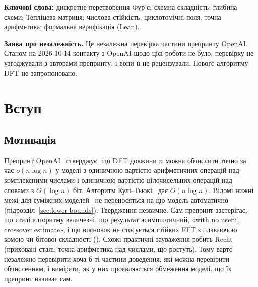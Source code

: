 \documentclass[11pt]{article}
\theoremstyle{plain}
\newcommand{\en}[1]{\foreignlanguage{english}{#1}}
\begin{document}
\noindent\textbf{Ключові слова:} дискретне перетворення Фур'є; схемна складність; глибина схеми; Тепліцева матриця; числова стійкість; циклотомічні поля; точна арифметика; формальна верифікація (Lean).

\medskip
\noindent\textbf{Заява про незалежність.} Це незалежна перевірка частини препринту OpenAI. Станом на 2026-10-14 контакту з OpenAI щодо цієї роботи не було; перевірку не узгоджували з авторами препринту, і вони її не рецензували. Нового алгоритму DFT не запропоновано.

\section{Вступ}\label{sec:intro}

\subsection{Мотивація}
Препринт OpenAI~\citep{openai2026} стверджує, що DFT довжини $n$ можна обчислити точно за час $o(n\log n)$ у моделі з одиничною вартістю арифметичних операцій над комплексними числами і одиничною вартістю цілочисельних операцій над словами з $O(\log n)$ біт. Алгоритм Кулі--Тьюкі~\citep{cooley1965} дає $O(n\log n)$. Відомі нижні межі для суміжних моделей~\citep{morgenstern1973,ailon2013,ailon2014} не переносяться на цю модель автоматично (підрозділ~\ref{sec:lower-bounds}). Твердження незвичне. Сам препринт застерігає, що сталі алгоритму величезні, що результат асимптотичний, «\en{with no useful crossover estimate}», і що висновок не стосується стійких FFT з плаваючою комою чи бітової складності (). Схожі практичні зауваження робить Recht~\citep{recht2026} (приховані сталі; точна арифметика над числами, що ростуть). Тому варто незалежно перевірити хоча б ті частини доведення, які можна перевірити обчисленням, і виміряти, як у них проявляються обмеження моделі, що їх препринт називає сам.
\end{document}
